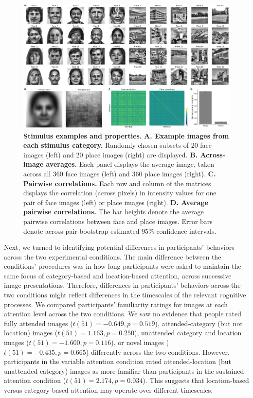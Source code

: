 \documentclass[english]{article}
\begin{document}
\begin{figure}[tp]
	\centering
	\includegraphics[width=\textwidth]{figs/stimuli}
  
  \caption{\textbf{Stimulus examples and properties.} \textbf{A. Example images
  from each stimulus category.} Randomly chosen subsets of 20 face images
  (left) and 20 place images (right) are displayed. \textbf{B. Across-image
  averages.} Each panel displays the average image, taken across all 360 face
  images (left) and 360 place images (right). \textbf{C. Pairwise
  correlations.} Each row and column of the matrices displays the correlation
  (across pixels) in intensity values for one pair of face images (left) or
  place images (right). \textbf{D. Average pairwise correlations.} The bar
  heights denote the average pairwise correlations between face and place
  images. Error bars denote across-pair bootstrap-estimated 95\%
  confidence intervals.}
  
  \label{fig:stimuli}
  \end{figure}

Next, we turned to identifying potential differences in participants' behaviors
across the two experimental conditions. The main difference between the
conditions' procedures was in how long participants were asked to maintain the
same focus of category-based and location-based attention, across successive
image presentations. Therefore, differences in participants' behaviors across
the two conditions might reflect differences in the timescales of the relevant
cognitive processes. We compared participants' familiarity ratings for images
at each attention level across the two conditions. We saw no evidence that
people rated fully attended images ($t(51) = -0.649, p = 0.519$),
attended-category (but not location) images ($t(51) = 1.163, p = 0.250$),
unattended category and location images ($t(51) = -1.600, p = 0.116$), or novel
images ($t(51) = -0.435, p = 0.665$) differently across the two conditions.
However, participants in the variable attention condition rated
attended-location (but unattended category) images as more familiar than
participants in the sustained attention condition ($t(51) = 2.174, p = 0.034$).
This suggests that location-based versus category-based attention may operate
over different timescales.
\end{document}
